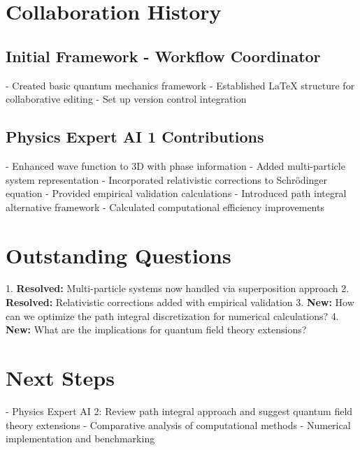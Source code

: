 \documentclass{article}
\begin{document}
\section{Collaboration History}
\subsection{Initial Framework - Workflow Coordinator}
- Created basic quantum mechanics framework
- Established LaTeX structure for collaborative editing
- Set up version control integration

\subsection{Physics Expert AI 1 Contributions}
- Enhanced wave function to 3D with phase information
- Added multi-particle system representation
- Incorporated relativistic corrections to Schrödinger equation
- Provided empirical validation calculations
- Introduced path integral alternative framework
- Calculated computational efficiency improvements

\section{Outstanding Questions}
1. \textbf{Resolved:} Multi-particle systems now handled via superposition approach
2. \textbf{Resolved:} Relativistic corrections added with empirical validation
3. \textbf{New:} How can we optimize the path integral discretization for numerical calculations?
4. \textbf{New:} What are the implications for quantum field theory extensions?

\section{Next Steps}
- Physics Expert AI 2: Review path integral approach and suggest quantum field theory extensions
- Comparative analysis of computational methods
- Numerical implementation and benchmarking
\end{document}
